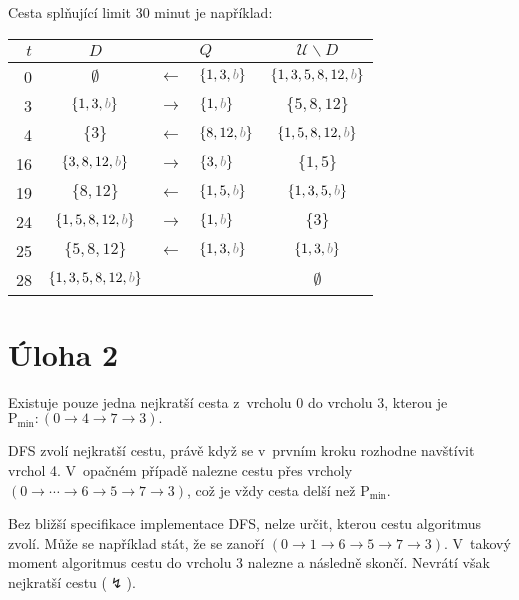 \documentclass{article}
\newcommand{\U}{\mathcal{U}}
\newcommand{\myb}{{\color{gray} b}}
\newcommand{\Pmin}{\text{P}_\text{min}}
\begin{document}
Cesta splňující limit 30 minut je například:
{\def\arraystretch{1.2}
\begin{center}
    \begin{tabular}
        { r !{\color{lightgray}\vrule} c !{\color{lightgray}\vrule} r l !{\color{lightgray}\vrule} c }
        $t$ & $D$                        &               & $Q$               & $\U \smallsetminus D$      \\
           & $\emptyset$                & $\leftarrow$  & $\{1,3, \myb\}$   & $\{1, 3, 5, 8, 12, \myb\}$ \\[2mm]
        3   & $\{1, 3, \myb\}$           & $\rightarrow$ & $\{1, \myb\}$     & $\{5, 8, 12\}$             \\[2mm]
        4   & $\{3\}$                    & $\leftarrow$  & $\{8, 12, \myb\}$ & $\{1, 5, 8, 12, \myb\}$    \\[2mm]
        16  & $\{3, 8, 12, \myb\}$       & $\rightarrow$ & $\{3, \myb\}$     & $\{1, 5\}$                 \\[2mm]
        19  & $\{8, 12\}$                & $\leftarrow$  & $\{1, 5, \myb\}$  & $\{1, 3, 5, \myb\}$        \\[2mm]
        24  & $\{1, 5, 8, 12, \myb\}$    & $\rightarrow$ & $\{1, \myb\}$     & $\{3\}$                    \\[2mm]
        25  & $\{5, 8, 12\}$             & $\leftarrow$  & $\{1,3, \myb\}$   & $\{1, 3, \myb\}$           \\[2mm]
        28  & $\{1, 3, 5, 8, 12, \myb\}$ &               &                   & $\emptyset$                \\[2mm]
    \end{tabular}
\end{center}}

\section*{Úloha 2}

Existuje pouze jedna nejkratší cesta z~vrcholu 0 do vrcholu 3, kterou je
\(
\Pmin: (0 \rightarrow 4 \rightarrow 7 \rightarrow 3).
\)

DFS zvolí nejkratší cestu, právě když se v~prvním kroku rozhodne navštívit vrchol 4.
V~opačném případě nalezne cestu přes vrcholy $(0 \rightarrow \cdots \rightarrow 6 \rightarrow 5 \rightarrow 7 \rightarrow 3)$,
což je vždy cesta delší než $\Pmin$.

Bez bližší specifikace implementace DFS, nelze určit, kterou cestu algoritmus zvolí. Může se například stát, že se zanoří $(0 \rightarrow 1 \rightarrow 6 \rightarrow 5 \rightarrow 7 \rightarrow 3)$. V~takový moment algoritmus cestu do vrcholu 3 nalezne a následně skončí. Nevrátí však nejkratší cestu ($\lightning$).
\end{document}
